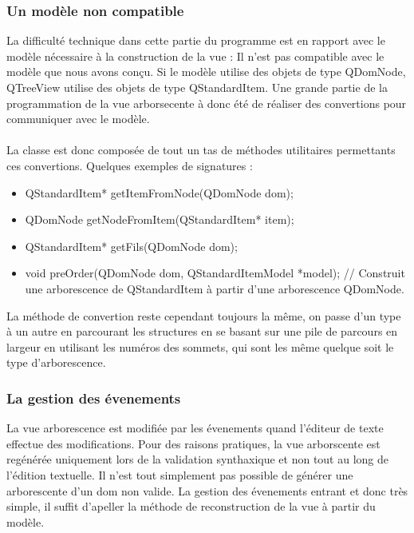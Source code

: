 \subsubsection{Un modèle non compatible}


La difficulté technique dans cette partie du programme est en rapport avec le modèle nécessaire à la construction de la vue :
Il n'est pas compatible avec le modèle que nous avons conçu. Si le modèle utilise des objets de type QDomNode, QTreeView utilise des objets de type QStandardItem. Une grande partie de la programmation de la vue arborsecente à donc été de réaliser des convertions pour communiquer avec le modèle.
\paragraph{}

La classe est donc composée de tout un tas de méthodes utilitaires permettants ces convertions. Quelques exemples de signatures :
\begin{itemize}
\item QStandardItem* getItemFromNode(QDomNode dom);
\item QDomNode getNodeFromItem(QStandardItem* item);
\item QStandardItem* getFils(QDomNode dom);
\item void preOrder(QDomNode dom, QStandardItemModel *model); // Construit une arborescence de QStandardItem à partir d'une arborescence QDomNode.
\end{itemize}

La méthode de convertion reste cependant toujours la même, on passe d'un type à un autre en parcourant les structures en se basant
sur une pile de parcours en largeur en utilisant les numéros des sommets, qui sont les même quelque soit le type d'arborescence.

\subsubsection{La gestion des évenements}

La vue arborescence est modifiée par les évenements quand l'éditeur de texte effectue des modifications.
Pour des raisons pratiques, la vue arborscente est regénérée uniquement lors de la validation synthaxique et non tout au long de
l'édition textuelle. Il n'est tout simplement pas possible de générer une arborescente d'un dom non valide.
La gestion des évenements entrant et donc très simple, il suffit d'apeller la méthode de reconstruction de la vue à partir du modèle.
